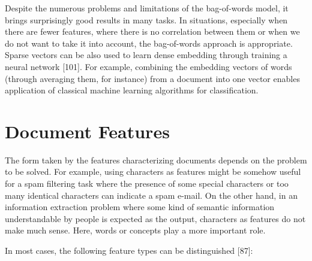 \documentclass[11pt,openany,executivepaper]{book}
\begin{document}
Despite the numerous problems and limitations of the bag-of-words mo\-del, it brings surprisingly good results in many tasks. In situations, especially when there are fewer features, where there is no correlation between them or when we do not want to take it into account, the bag-of-words approach is appropriate. Sparse vectors can be also used to learn dense embedding through training a neural network [101]. For example, combining the embedding vectors of words (through averaging them, for instance) from a document into one vector enables application of classical machine learning algorithms for classification.

\section{Document Features}
The form taken by the features characterizing documents depends on the problem to be solved. For example, using characters as features might be somehow useful for a spam filtering task where the presence of some special characters or too many identical characters can indicate a spam e-mail. On the other hand, in an information extraction problem where some kind of semantic information understandable by people is expected as the output, characters as features do not make much sense. Here, words or concepts play a more important role.

In most cases, the following feature types can be distinguished [87]:
\end{document}

